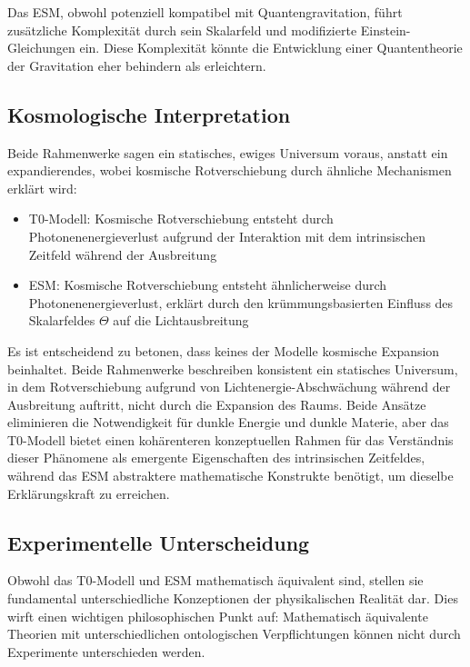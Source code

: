 \documentclass[12pt,a4paper]{article}
\begin{document}
	Das ESM, obwohl potenziell kompatibel mit Quantengravitation, führt zusätzliche Komplexität durch sein Skalarfeld und modifizierte Einstein-Gleichungen ein. Diese Komplexität könnte die Entwicklung einer Quantentheorie der Gravitation eher behindern als erleichtern.
	
	\subsection{Kosmologische Interpretation}
	\label{subsec:cosmological_interpretation}
	
	Beide Rahmenwerke sagen ein statisches, ewiges Universum voraus, anstatt ein expandierendes, wobei kosmische Rotverschiebung durch ähnliche Mechanismen erklärt wird:
	
	\begin{itemize}
		\item T0-Modell: Kosmische Rotverschiebung entsteht durch Photonenenergieverlust aufgrund der Interaktion mit dem intrinsischen Zeitfeld während der Ausbreitung
		\item ESM: Kosmische Rotverschiebung entsteht ähnlicherweise durch Photonenenergieverlust, erklärt durch den krümmungsbasierten Einfluss des Skalarfeldes \(\Theta\) auf die Lichtausbreitung
	\end{itemize}
	
	Es ist entscheidend zu betonen, dass keines der Modelle kosmische Expansion beinhaltet. Beide Rahmenwerke beschreiben konsistent ein statisches Universum, in dem Rotverschiebung aufgrund von Lichtenergie-Abschwächung während der Ausbreitung auftritt, nicht durch die Expansion des Raums. Beide Ansätze eliminieren die Notwendigkeit für dunkle Energie und dunkle Materie, aber das T0-Modell bietet einen kohärenteren konzeptuellen Rahmen für das Verständnis dieser Phänomene als emergente Eigenschaften des intrinsischen Zeitfeldes, während das ESM abstraktere mathematische Konstrukte benötigt, um dieselbe Erklärungskraft zu erreichen.
	
	\subsection{Experimentelle Unterscheidung}
	\label{subsec:experimental_discrimination}
	
	Obwohl das T0-Modell und ESM mathematisch äquivalent sind, stellen sie fundamental unterschiedliche Konzeptionen der physikalischen Realität dar. Dies wirft einen wichtigen philosophischen Punkt auf: Mathematisch äquivalente Theorien mit unterschiedlichen ontologischen Verpflichtungen können nicht durch Experimente unterschieden werden.
	
\end{document}
